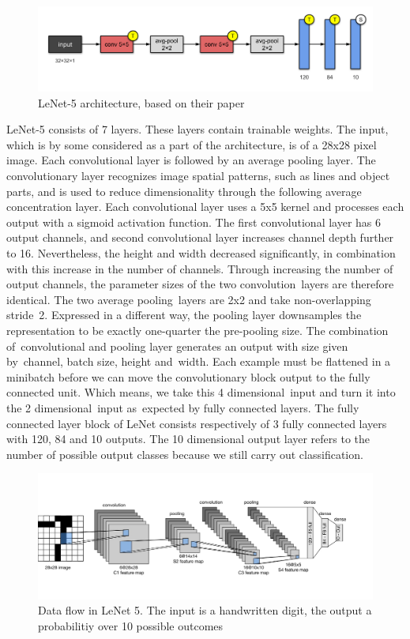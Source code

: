 \begin{figure}[H]
  \centering
  \includegraphics[scale=0.45]{images/Chapter4/lenet5.png}
  \caption{LeNet-5 architecture, based on their paper \cite{lecun1998gradient}}
  \label{lenet5}
\end{figure}
\par
LeNet-5 consists of 7 layers. These layers contain trainable weights. The input, which is by some considered as a part of the architecture, is of a 28x28 pixel image. Each convolutional layer is followed by an average pooling layer. The convolutionary layer recognizes image spatial patterns, such as lines and object parts, and is used to reduce dimensionality through the following average concentration layer. Each convolutional layer uses a 5x5 kernel and processes each output with a sigmoid activation function. The first convolutional layer has 6 output channels, and second convolutional layer increases channel depth further to 16. Nevertheless, the height and width decreased significantly, in combination with this increase in the number of channels. Through increasing the number of output channels, the parameter sizes of the two convolution layers are therefore identical. The two average pooling layers are 2x2 and take non-overlapping stride 2. Expressed in a different way, the pooling layer downsamples the representation to be exactly one-quarter the pre-pooling size. The combination of convolutional and pooling layer generates an output with size given by channel, batch size, height and width. Each example must be flattened in a minibatch before we can move the convolutionary block output to the fully connected unit. Which means, we take this 4 dimensional input and turn it into the 2 dimensional input as expected by fully connected layers. The fully connected layer block of LeNet consists respectively of 3 fully connected layers with 120, 84 and 10 outputs. The 10 dimensional output layer refers to the number of possible output classes because we still carry out classification.
\begin{figure}[H]
  \centering
  \includegraphics[scale=0.14]{images/Chapter4/lenet.jpg}
  \caption{Data flow in LeNet 5. The input is a handwritten digit, the output a probabilitiy over 10 possible outcomes}
  \label{lenet5}
\end{figure}
\par


